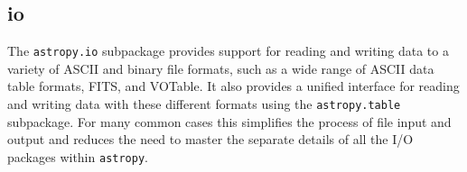 \documentclass[modern]{aastex61}
\newcommand{\package}[1]{\texttt{#1}\xspace}
\newcommand{\astropypkg}{\package{astropy}}
\newcommand{\inlinecomment}[2]{\todo[inline]{#1: #2}\xspace}
\begin{document}
\subsection{io}

The \package{astropy.io} subpackage provides support for reading and writing
data to a variety of ASCII and binary file formats, such as a wide range of
ASCII data table formats, FITS, and VOTable.
It also provides a unified interface for reading and writing data with these
different formats using the \package{astropy.table} subpackage.
For many common cases this simplifies the process of file input and output and
reduces the need to master the separate details of all the I/O packages within
\astropypkg.



\end{document}
